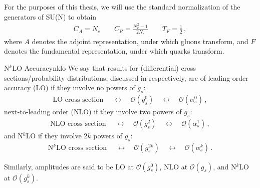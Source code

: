 For the purposes of this thesis, we will use the standard normalization of the generators of SU(N) to obtain
\begin{align}
    C_A = N_c
    \qquad
    C_R = \frac{N_c^2 - 1}{2 N_c}
    \qquad
    T_F = \frac{1}{2}
    \,,
\end{align}
where \(A\) denotes the adjoint representation, under which gluons transform, and \(F\) denotes the fundamental representation, under which quarks transform.



\begin{definitionbox}{N\(^k\)LO Accuracy}{nklo}
    We say that results for (differential) cross sections/probability distributions, discussed in  respectively, are of leading-order accuracy (LO) if they involve no powers of \(g_s\):
    \begin{align}
        \text{LO cross section }
        \quad \leftrightarrow \quad
        \mathcal{O}(g_s^{0})
        \quad \leftrightarrow \quad
        \mathcal{O}(\alpha_s^0)
        \,,
    \end{align}
    next-to-leading order (NLO) if they involve two powers of \(g_s\):
    \begin{align}
        \text{NLO cross section }
        \quad \leftrightarrow \quad
        \mathcal{O}(g_s^{2})
        \quad \leftrightarrow \quad
        \mathcal{O}(\alpha_s^1)
        \,,
    \end{align}
    and N\(^k\)LO if they involve \(2k\) powers of \(g_s\):
    \begin{align}
        \text{N\(^k\)LO cross section }
        \quad \leftrightarrow \quad
        \mathcal{O}(g_s^{2k})
        \quad \leftrightarrow \quad
        \mathcal{O}(\alpha_s^k)
        \,.
    \end{align}

    Similarly, amplitudes are said to be LO at \(\mathcal{O}(g_s^0)\), NLO at \(\mathcal{O}(g_s)\), and N\(^k\)LO at \(\mathcal{O}(g_s^k)\).
\end{definitionbox}


